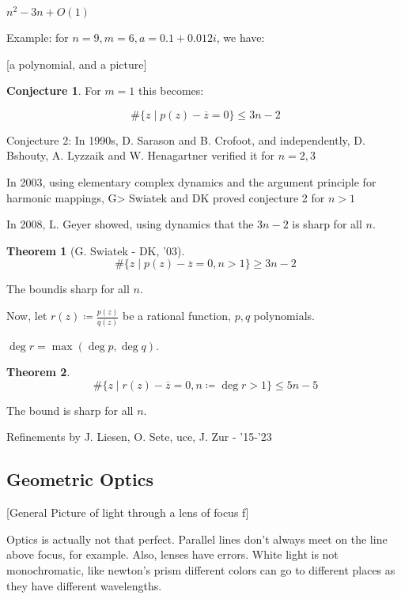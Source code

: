 \documentclass{article}
\theoremstyle{definition}
\newtheorem{theorem}{Theorem}
\newtheorem{conjecture}{Conjecture}
\begin{document}
\(n^2 -3n + O(1)\)

Example: for \(n = 9, m = 6, a = 0.1 + 0.012i\), we have:

[a polynomial, and a picture]

\begin{conjecture}
    For \(m = 1\) this becomes:

    \[
        \#\{ z \mid  p(z) - \overline{z} = 0 \} \leq 3n - 2
    \]
\end{conjecture}

Conjecture 2: In 1990s, D. Sarason and B. Crofoot, and independently, D. Bshouty, A. Lyzzaik and W. Henagartner verified it for \(n = 2,3\)

In 2003, using elementary complex dynamics and the argument principle for harmonic mappings, G> Swiatek and DK proved conjecture 2 for \(n > 1\)

In 2008, L. Geyer showed, using dynamics that the \(3n - 2\) is sharp for all \(n\).

\begin{theorem}
    [G. Swiatek - DK, '03]

    \[
        \#\{ z \mid p(z) - \overline{z} = 0, n > 1 \} \geq 3n-2
    \]

    The boundis sharp for all \(n\).
\end{theorem}

Now, let \(r(z) \coloneqq \frac{p(z)}{q(z)}\) be a rational function, \(p,q\) polynomials.

\(\deg r = \max(\deg p, \deg q)\).

\begin{theorem}
    \[
        \#\{ z \mid r(z) - \overline{z} = 0, n \coloneqq \deg r > 1 \} \leq 5n - 5
    \]

    The bound is sharp for all \(n\).
\end{theorem}

Refinements by J. Liesen, O. Sete, uce, J. Zur - '15-'23

\subsection*{Geometric Optics}

[General Picture of light through a lens of focus f]

Optics is actually not that perfect. Parallel lines don't always meet on the line above focus, for example. Also, lenses have errors. White light is not monochromatic, like newton's prism different colors can go to different places as they have different wavelengths.
\end{document}
